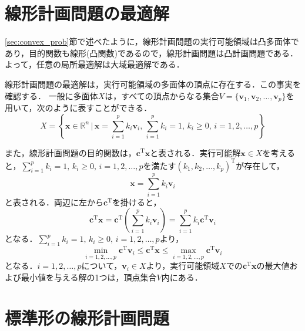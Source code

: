 \documentclass{jsreport}
\begin{document}
\section{線形計画問題の最適解}
\ref{sec:convex_prob}節で述べたように，線形計画問題の実行可能領域は凸多面体であり，目的関数も線形(凸関数)であるので，線形計画問題は凸計画問題である．よって，任意の局所最適解は大域最適解である．

線形計画問題の最適解は，実行可能領域の多面体の頂点に存在する．この事実を確認する．
一般に多面体$X$は，すべての頂点からなる集合$V = \{\bm{v}_1, \bm{v}_2, \ldots, \bm{v}_p\}$を用いて，次のように表すことができる．
\begin{equation}
  X = \left\{\bm{x} \in \mathbb{R}^n \, | \, \bm{x} = \sum_{i = 1}^p k_i \bm{v}_i , \, \sum_{i = 1}^p k_i = 1, \, k_i \geq 0, \, i = 1, 2, \ldots, p \right\} \nonumber
\end{equation}

また，線形計画問題の目的関数は，$\bm{c}^{\mathrm{T}}\bm{x}$と表される．実行可能解$\bm{x} \in X$を考えると，$\sum_{i = 1}^p k_i = 1, \, k_i \geq 0, \, i = 1, 2, \ldots, p$を満たす$(k_1, k_2, \ldots, k_p)^{\mathrm{T}}$が存在して，
\begin{equation}
  \bm{x} = \sum_{i = 1}^p k_i \bm{v}_i \nonumber
\end{equation}
と表される．両辺に左から$\bm{c}^{\mathrm{T}}$を掛けると，
\begin{equation}
  \bm{c}^{\mathrm{T}} \bm{x} = \bm{c}^{\mathrm{T}} \left(\sum_{i = 1}^p k_i \bm{v}_i \right) = \sum_{i = 1}^p k_i \bm{c}^{\mathrm{T}} \bm{v}_i \nonumber
\end{equation}
となる．$\sum_{i = 1}^p k_i = 1, \, k_i \geq 0, \, i = 1, 2, \ldots, p$より，
\begin{equation}
  \min_{i = 1, 2, \ldots, p} \bm{c}^{\mathrm{T}} \bm{v}_i \leq \bm{c}^{\mathrm{T}} \bm{x} \leq \max_{i = 1, 2, \ldots, p} \bm{c}^{\mathrm{T}} \bm{v}_i \nonumber
\end{equation}
となる．$i = 1, 2, \ldots, p$について，$\bm{v}_i \in X$より，実行可能領域$X$での$\bm{c}^{\mathrm{T}}\bm{x}$の最大値および最小値を与える解の1つは，頂点集合$V$内にある．

\section{標準形の線形計画問題}
\end{document}

